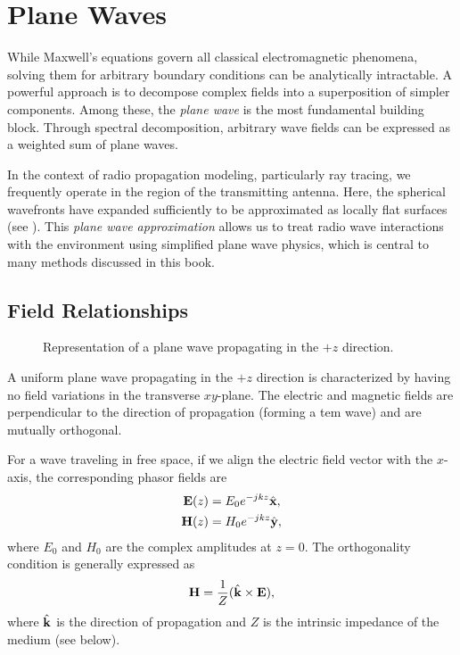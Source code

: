 \section{Plane Waves}

While Maxwell's equations govern all classical electromagnetic phenomena, solving them for arbitrary boundary conditions can be analytically intractable. A powerful approach is to decompose complex fields into a superposition of simpler components. Among these, the \emph{plane wave} is the most fundamental building block. Through spectral decomposition, arbitrary wave fields can be expressed as a weighted sum of plane waves.

\begin{marginfigure}
  \centering
  \caption{Spherical wavefronts from a point source can be approximated as locally planar in the  region.}
\end{marginfigure}

In the context of radio propagation modeling, particularly ray tracing, we frequently operate in the \emph{} region of the transmitting antenna. Here, the spherical wavefronts have expanded sufficiently to be approximated as locally flat surfaces (see ). This \emph{plane wave approximation} allows us to treat radio wave interactions with the environment using simplified plane wave physics, which is central to many methods discussed in this book.

\subsection{Field Relationships}

\begin{figure}
  \centering
  \caption{Representation of a plane wave propagating in the $+z$ direction.}
\end{figure}

A uniform plane wave propagating in the $+z$ direction is characterized by having no field variations in the transverse $xy$-plane. The electric and magnetic fields are perpendicular to the direction of propagation (forming a \gls{tem} wave) and are mutually orthogonal.

For a wave traveling in \gls{free space}, if we align the electric field vector with the $x$-axis, the corresponding phasor fields are
\begin{align}
  \mathbf{E}(z) &= E_0 e^{-jkz} \hat{\mathbf{x}},\\
  \mathbf{H}(z) &= H_0 e^{-jkz} \hat{\mathbf{y}},
\end{align}
where $E_0$ and $H_0$ are the complex amplitudes at $z=0$. The orthogonality condition is generally expressed as
\begin{equation}
  \mathbf{H} = \frac{1}{Z} (\hat{\mathbf{k}} \times \mathbf{E}),
\end{equation}
where $\hat{\mathbf{k}}$ is the direction of propagation and $Z$ is the intrinsic impedance of the medium (see below).

